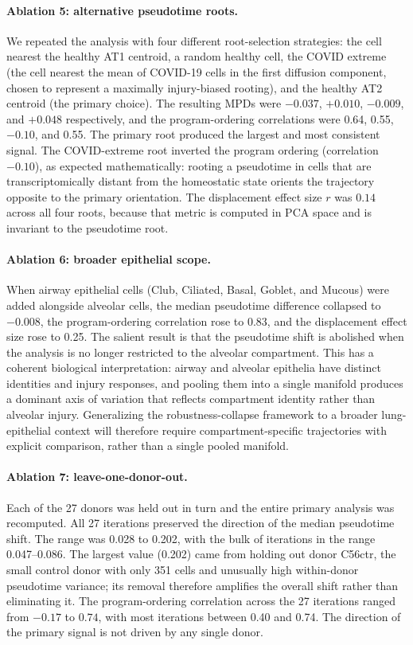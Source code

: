 \documentclass[11pt]{article}
\begin{document}
\paragraph{Ablation 5: alternative pseudotime roots.} We repeated the analysis with four different root-selection strategies: the cell nearest the healthy AT1 centroid, a random healthy cell, the COVID extreme (the cell nearest the mean of COVID-19 cells in the first diffusion component, chosen to represent a maximally injury-biased rooting), and the healthy AT2 centroid (the primary choice). The resulting MPDs were $-0.037$, $+0.010$, $-0.009$, and $+0.048$ respectively, and the program-ordering correlations were 0.64, 0.55, $-0.10$, and 0.55. The primary root produced the largest and most consistent signal. The COVID-extreme root inverted the program ordering (correlation $-0.10$), as expected mathematically: rooting a pseudotime in cells that are transcriptomically distant from the homeostatic state orients the trajectory opposite to the primary orientation. The displacement effect size $r$ was $0.14$ across all four roots, because that metric is computed in PCA space and is invariant to the pseudotime root.

\paragraph{Ablation 6: broader epithelial scope.} When airway epithelial cells (Club, Ciliated, Basal, Goblet, and Mucous) were added alongside alveolar cells, the median pseudotime difference collapsed to $-0.008$, the program-ordering correlation rose to 0.83, and the displacement effect size rose to 0.25. The salient result is that the pseudotime shift is abolished when the analysis is no longer restricted to the alveolar compartment. This has a coherent biological interpretation: airway and alveolar epithelia have distinct identities and injury responses, and pooling them into a single manifold produces a dominant axis of variation that reflects compartment identity rather than alveolar injury. Generalizing the robustness-collapse framework to a broader lung-epithelial context will therefore require compartment-specific trajectories with explicit comparison, rather than a single pooled manifold.

\paragraph{Ablation 7: leave-one-donor-out.} Each of the 27 donors was held out in turn and the entire primary analysis was recomputed. All 27 iterations preserved the direction of the median pseudotime shift. The range was 0.028 to 0.202, with the bulk of iterations in the range 0.047--0.086. The largest value (0.202) came from holding out donor C56ctr, the small control donor with only 351 cells and unusually high within-donor pseudotime variance; its removal therefore amplifies the overall shift rather than eliminating it. The program-ordering correlation across the 27 iterations ranged from $-0.17$ to $0.74$, with most iterations between 0.40 and 0.74. The direction of the primary signal is not driven by any single donor.
\end{document}
